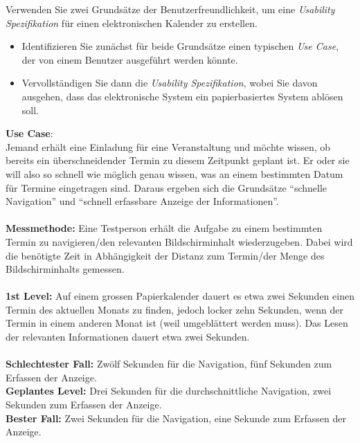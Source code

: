 \begin{exercise}
  Verwenden Sie zwei Grundsätze der Benutzerfreundlichkeit, 
  um eine \textit{Usability Spezifikation} für einen elektronischen Kalender zu erstellen.
  \begin{itemize}
    \item{
      Identifizieren Sie zunächst für beide Grundsätze einen typischen \textit{Use Case}, 
      der von einem Benutzer ausgeführt werden könnte.
    }
    \item{
      Vervollständigen Sie dann die \textit{Usability Spezifikation}, 
      wobei Sie davon ausgehen, 
      dass das elektronische System ein papierbasiertes System ablösen soll.
    }
  \end{itemize}
  \vspace{0.5cm}
\end{exercise}
\textbf{Use Case}:\\
Jemand erhält eine Einladung für eine Veranstaltung und möchte wissen,
ob bereits ein überschneidender Termin zu diesem Zeitpunkt geplant ist.
Er oder sie will also so schnell wie möglich genau wissen,
was an einem bestimmten Datum für Termine eingetragen sind.
Daraus ergeben sich die Grundsätze \enquote{schnelle Navigation} und \enquote{schnell erfassbare Anzeige der Informationen}.\\\\
\textbf{Messmethode:} Eine Testperson erhält die Aufgabe 
zu einem bestimmten Termin zu navigieren/den relevanten Bildschirminhalt wiederzugeben.
Dabei wird die benötigte Zeit in Abhängigkeit der Distanz zum Termin/der Menge des Bildschirminhalts gemessen.\\\\
\textbf{1st Level:} Auf einem grossen Papierkalender dauert es etwa zwei Sekunden einen Termin des aktuellen Monats zu finden,
jedoch locker zehn Sekunden,
wenn der Termin in einem anderen Monat ist (weil umgeblättert werden muss). 
Das Lesen der relevanten Informationen dauert etwa zwei Sekunden.\\\\
\textbf{Schlechtester Fall:} Zwölf Sekunden für die Navigation, fünf Sekunden zum Erfassen der Anzeige.\\
\textbf{Geplantes Level:} Drei Sekunden für die durchschnittliche Navigation, zwei Sekunden zum Erfassen der Anzeige.\\
\textbf{Bester Fall:} Zwei Sekunden für die Navigation, eine Sekunde zum Erfassen der Anzeige.